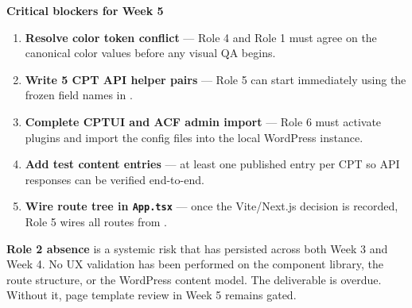 \documentclass[12pt,a4paper]{article}
\begin{document}
\vspace{1em}

\begin{yellowbox}
\textbf{\color{uvtDarkBlue}Critical blockers for Week 5}

\vspace{6pt}
\color{textGray}
\begin{enumerate}
    \item \textbf{Resolve color token conflict} --- Role 4 and Role 1 must
          agree on the canonical color values before any visual QA begins.
    \item \textbf{Write 5 CPT API helper pairs} --- Role 5 can start
          immediately using the frozen field names in
          .
    \item \textbf{Complete CPTUI and ACF admin import} --- Role 6 must
          activate plugins and import the config files into the local
          WordPress instance.
    \item \textbf{Add test content entries} --- at least one published entry
          per CPT so API responses can be verified end-to-end.
    \item \textbf{Wire route tree in \texttt{App.tsx}} --- once the
          Vite/Next.js decision is recorded, Role 5 wires all routes from
          .
\end{enumerate}
\end{yellowbox}

\vspace{1em}

\begin{bluebox}
\textbf{Role 2 absence} is a systemic risk that has persisted across both
Week 3 and Week 4. No UX validation has been performed on the component
library, the route structure, or the WordPress content model. The
 deliverable is overdue. Without
it, page template review in Week 5 remains gated.
\end{bluebox}
\end{document}
